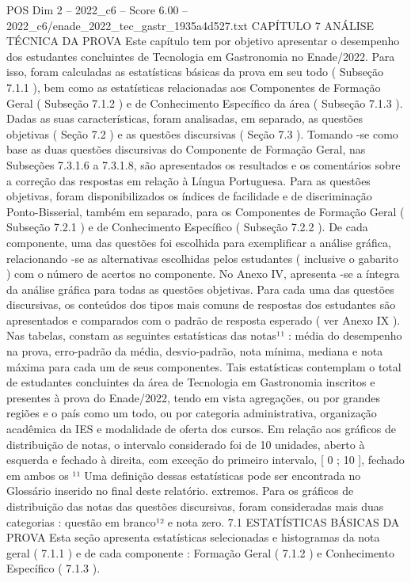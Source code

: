 \begin{textsample}{POS Dim 2 – 2022\_c6 – Score 6.00 – 2022\_c6/enade\_2022\_tec\_gastr\_1935a4d527.txt}  \label{ex:f2_pos_139}
CAPÍTULO 7 ANÁLISE TÉCNICA DA PROVA Este capítulo tem por objetivo apresentar o desempenho dos estudantes concluintes de Tecnologia em Gastronomia no Enade/2022.
Para isso, foram calculadas as estatísticas básicas da prova em seu todo ( Subseção 7.1.1 ), bem como as estatísticas relacionadas aos Componentes de Formação Geral ( Subseção 7.1.2 ) e de Conhecimento Específico da área ( Subseção 7.1.3 ).
Dadas as suas características, foram analisadas, em separado, as questões objetivas ( Seção 7.2 ) e as questões discursivas ( Seção 7.3 ).
Tomando -se como base as duas questões discursivas do Componente de Formação Geral, nas Subseções 7.3.1.6 a 7.3.1.8, são apresentados os resultados e os comentários sobre a correção das respostas em relação à Língua Portuguesa.
Para as questões objetivas, foram disponibilizados os índices de facilidade e de discriminação Ponto-Bisserial, também em separado, para os Componentes de Formação Geral ( Subseção 7.2.1 ) e de Conhecimento Específico ( Subseção 7.2.2 ).
De cada componente, uma das questões foi escolhida para exemplificar a análise gráfica, relacionando -se as alternativas escolhidas pelos estudantes ( inclusive o gabarito ) com o número de acertos no componente.
No Anexo IV, apresenta -se a íntegra da análise gráfica para todas as questões objetivas.
Para cada uma das questões discursivas, os conteúdos dos tipos mais comuns de respostas dos estudantes são apresentados e comparados com o padrão de resposta esperado ( ver Anexo IX ).
Nas tabelas, constam as seguintes estatísticas das notas¹¹ : média do desempenho na prova, erro-padrão da média, desvio-padrão, nota mínima, mediana e nota máxima para cada um de seus componentes.
Tais estatísticas contemplam o total de estudantes concluintes da área de Tecnologia em Gastronomia inscritos e presentes à prova do Enade/2022, tendo em vista agregações, ou por grandes regiões e o país como um todo, ou por categoria administrativa, organização acadêmica da IES e modalidade de oferta dos cursos.
Em relação aos gráficos de distribuição de notas, o intervalo considerado foi de 10 unidades, aberto à esquerda e fechado à direita, com exceção do primeiro intervalo, [ 0 ; 10 ], fechado em ambos os ¹¹ Uma definição dessas estatísticas pode ser encontrada no Glossário inserido no final deste relatório. extremos.
Para os gráficos de distribuição das notas das questões discursivas, foram consideradas mais duas categorias : questão em branco¹² e nota zero. 7.1 ESTATÍSTICAS BÁSICAS DA PROVA Esta seção apresenta estatísticas selecionadas e histogramas da nota geral ( 7.1.1 ) e de cada componente : Formação Geral ( 7.1.2 ) e Conhecimento Específico ( 7.1.3 ).

\end{textsample}
